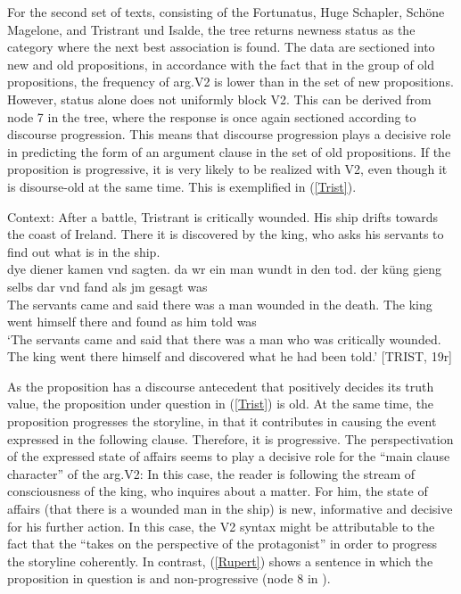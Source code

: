 \documentclass[output=paper,colorlinks,citecolor=brown]{langscibook}
\begin{document}
For the second set of texts, consisting of the Fortunatus, Huge Schapler, Schöne Magelone, and Tristrant und Isalde, the tree returns newness status as the category where the next best association is found. The data are sectioned into new and old propositions, in accordance with the fact that in the group of old propositions, the frequency of arg.V2 is lower than in the set of new propositions. However,  status alone does not uniformly block V2. This can be derived from node 7 in the tree, where the response is once again sectioned according to discourse progression. This means that discourse progression plays a decisive role in predicting the form of an argument clause in the set of old propositions. If the proposition is progressive, it is very likely to be realized with V2, even though it is disourse-old at the same time. This is exemplified in (\ref{Trist}).

\newpage 

\ea \label{Trist}
\glt Context: After a battle, Tristrant is critically wounded. His ship drifts towards the coast of Ireland. There it is discovered by the king, who asks his servants to find out what is in the ship.\\
\gll dye diener kamen vnd sagten. da w\oldae{}r ein man wundt in den tod. 
der küng gieng selbs dar vnd fand als jm gesagt was\\
The servants came and said there was a man wounded in the death. The king went himself there and found as him told was\\
\glt `The servants came and said that there was a man who was critically wounded. The king went there himself and discovered what he had been told.' \hfill [TRIST, 19r]
\z

As the proposition has a discourse antecedent that positively decides its truth value, the proposition under question in (\ref{Trist}) is old. At the same time, the proposition progresses the storyline, in that it contributes in causing the event expressed in the following clause. Therefore, it is progressive. The perspectivation of the expressed state of affairs seems to play a decisive role for the “main clause character” of the arg.V2: In this case, the reader is following the stream of consciousness of the king, who inquires about a matter. For him, the state of affairs (that there is a wounded man in the ship) is new, informative and decisive for his further action. In this case, the V2 syntax might be attributable to the fact that the  “takes on the perspective of the protagonist” in order to progress the storyline coherently. In contrast, (\ref{Rupert}) shows a sentence in which the proposition in question is  and non-progressive (node 8 in ).
\end{document}
